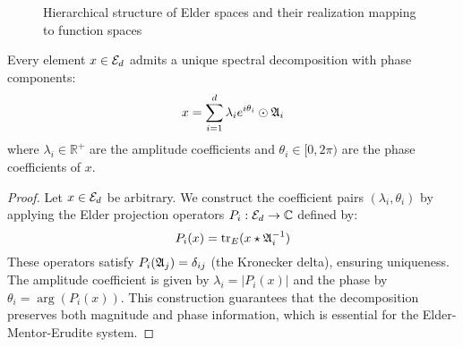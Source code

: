 \begin{figure}[htbp]
\centering
{}
\caption{Hierarchical structure of Elder spaces and their realization mapping to function spaces}
\label{fig:hierarchical-elder-structure}
\end{figure}

\begin{theorem}
Every element $x \in \mathcal{E}_{d}$ admits a unique spectral decomposition with phase components:
\begin{equation}
x = \sum_{i=1}^{d} \lambda_i e^{i\theta_i} \odot \mathfrak{A}_{i}
\end{equation}
where $\lambda_i \in \mathbb{R}^+$ are the amplitude coefficients and $\theta_i \in [0, 2\pi)$ are the phase coefficients of $x$.
\end{theorem}

\begin{proof}
Let $x \in \mathcal{E}_{d}$ be arbitrary. We construct the coefficient pairs $(\lambda_i, \theta_i)$ by applying the Elder projection operators $P_i : \mathcal{E}_{d} \to \mathbb{C}$ defined by:
\begin{equation}
P_i(x) = \mathrm{tr}_E(x \star \mathfrak{A}_{i}^{-1})
\end{equation}
These operators satisfy $P_i(\mathfrak{A}_{j}) = \delta_{ij}$ (the Kronecker delta), ensuring uniqueness. The amplitude coefficient is given by $\lambda_i = |P_i(x)|$ and the phase by $\theta_i = \arg(P_i(x))$. This construction guarantees that the decomposition preserves both magnitude and phase information, which is essential for the Elder-Mentor-Erudite system.
\end{proof}

